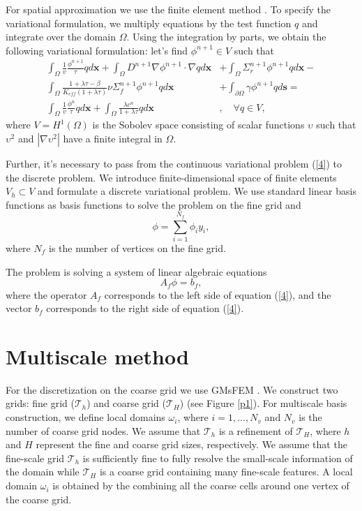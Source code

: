 \documentclass[10pt]{article}
\begin{document}
For spatial approximation we use the finite element method \cite{quarteroni}.
To specify the variational formulation, we multiply equations by the test function $q$ and integrate over the domain $\Omega$. 
Using the integration by parts, we obtain the following variational formulation: let's find $\phi^{n+1} \in V$ such that
\begin{equation} \label{6}
\begin{split}
\int_\Omega \frac{1}{v} \frac{\phi^{n+1}}{\tau} q d\bm x +
\int_\Omega D^{n+1} \nabla\phi^{n+1} \cdot \nabla q d\bm x &+ 
\int_\Omega \Sigma_r^{n+1} \phi^{n+1} q d\bm x - \\
\int_\Omega \frac{1+\lambda\tau-\beta}{K_{eff}(1+\lambda\tau)} \nu \Sigma_f^{n+1} \phi^{n+1} q d\bm x &+
\int_{\partial \Omega} \gamma \phi^{n+1} q d\bm s = \\
\int_\Omega \frac{1}{v} \frac{\phi^{n}}{\tau} q d\bm x +
\int_\Omega \frac{\lambda c^n}{1+\lambda\tau} q d\bm x &, \quad \forall q \in V,
\end{split}
\end{equation}
where $V=H^1(\Omega)$ is the Sobolev space consisting of scalar functions $\upsilon$ such that $\upsilon^2$ and $|\nabla \upsilon^2|$ have a finite integral in $\Omega$.

Further, it's necessary to pass from the continuous variational problem (\ref{4}) to the discrete problem. 
We introduce finite-dimensional space of finite elements $V_h \subset V$ and formulate a discrete variational problem. 
We use standard linear basis functions as basis functions to solve the problem on the fine grid and
\[
\phi = \sum_{i = 1}^{N_f} \phi_i y_i,
\] 
where $N_f$ is the number of vertices on the fine grid.

The problem is solving a system of linear algebraic equations
\begin{equation}\label{7}
A_f \phi = b_f,
\end{equation}
where the operator $A_f$ corresponds to the left side of equation (\ref{4}), and the vector $b_f$ corresponds to the right side of equation (\ref{4}).

\section{Multiscale method}
For the discretization on the coarse grid we use GMsFEM \cite{Efendiev2013}.
We construct two grids: fine grid ($\mathcal{T}_h$) and coarse grid ($\mathcal{T}_H$) (see Figure \ref{p1}). 
For multiscale basis construction, we define local domains $\omega_i$, where $i = 1,...,N_v$ and $N_v$ is the number of coarse grid nodes.
We assume that $\mathcal{T}_h$ is a refinement of $\mathcal{T}_H$, where $h$ and $H$ represent the fine and coarse grid sizes, respectively. 
We assume that the fine-scale grid $\mathcal{T}_h$ is sufficiently fine to fully resolve the small-scale information of the domain  while $\mathcal{T}_H$ is a coarse grid containing many fine-scale features.
A local domain $\omega_i$ is obtained by the combining all the coarse cells around one vertex of the coarse grid. 
\end{document}
